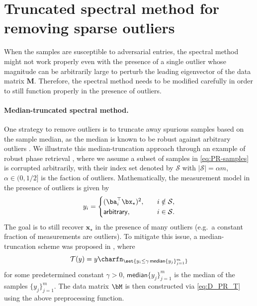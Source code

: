 
\section{Truncated spectral method for removing sparse outliers}

When the samples are susceptible to adversarial entries, the spectral method might not work properly even with the presence of a single outlier whose magnitude can be arbitrarily large to perturb the leading eigenvector of the data matrix $\bm{M}$. Therefore, the spectral method needs to be modified carefully in order to still function properly in the presence of outliers.

\paragraph{Median-truncated spectral method.} One strategy to remove outliers is to truncate away spurious samples based on the sample median, as the median is known to be robust against arbitrary outliers \citep{zhang2016provable,li2017nonconvex}. We illustrate this median-truncation approach through an example of robust phase retrieval \citep{zhang2016provable}, where we assume a subset of samples in \eqref{eq:PR-samples} is corrupted arbitrarily, with their index set denoted by $\mathcal{S}$ with $|\mathcal{S}|=\alpha  m$, $\alpha \in (0,1/2]$ is the faction of outliers. Mathematically, the measurement  model in the presence of outliers is given by
%
\begin{equation} \label{eq:robust_pr_model}
	y_i = \begin{cases}
(\ba_i^\top\bx_{\star})^2, \quad  & i \notin \mathcal{S}, \\
\mathsf{arbitrary} , & i \in \mathcal{S}. 
	\end{cases}
\end{equation}
%
The goal is to still recover $\bm{x}_{\star}$ in the presence of many outliers (e.g.~a constant fraction of measurements are outliers). To mitigate this issue, a median-truncation scheme was proposed in \cite{zhang2016provable,li2017nonconvex}, where
\begin{equation}\label{eq:T_median}
	\mathcal{T}(y)  = y \charfn_{\set{y_i \leq \gamma \, \mathsf{median}\{ y_j \}_{j=1}^m}}
\end{equation}
for some predetermined constant $\gamma >0$, $\mathsf{median}\{ y_j \}_{j=1}^m $ is the median of the samples $\{ y_j \}_{j=1}^m$. The data matrix $\bM$ is then constructed via \eqref{eq:D_PR_T} using the above preprocessing function.

